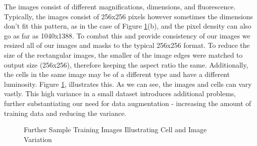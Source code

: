 \documentclass{article}
\begin{document}
The images consist of different magnifications, dimensions, and fluorescence. Typically, the images consist of 256x256 pixels however sometimes the dimensions don't fit this pattern, as in the case of Figure \ref{fig:DifferingTrains}(b), and the pixel density can also go as far as 1040x1388. To combat this and provide consistency of our images we resized all of our images and masks to the typical 256x256 format. To reduce the size of the rectangular images, the smaller of the image edges were matched to output size (256x256), therefore keeping the aspect ratio the same. Additionally, the cells in the same image may be of a different type and have a different luminosity. Figure \ref{fig:DifferingTrains}, illustrates this. As we can see, the images and cells can vary vastly. This high variance in a small dataset introduces additional problems, further substantiating our need for data augmentation - increasing the amount of training data and reducing the variance.

\begin{figure}[htbp]
    \vskip 5mm
    \centering
    \qquad
    \caption{Further Sample Training Images Illustrating Cell and Image Variation}%
    \label{fig:DifferingTrains}%
    \vskip 1mm
\end{figure}
\end{document}
